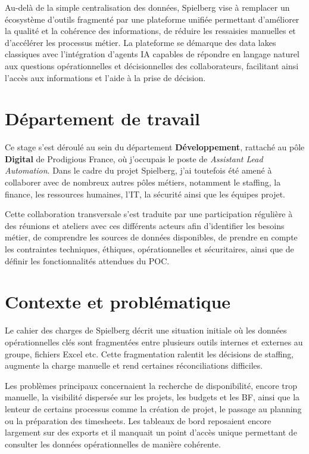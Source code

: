 \documentclass[a4paper,11pt,english,openany]{book}
\begin{document}
Au-delà de la simple centralisation des données, Spielberg vise à remplacer un écosystème d'outils fragmenté par une plateforme unifiée permettant d'améliorer la qualité et la cohérence des informations, de réduire les ressaisies manuelles et d'accélérer les processus métier. La plateforme se démarque des data lakes classiques avec l'intégration d'agents IA capables de répondre en langage naturel aux questions opérationnelles et décisionnelles des collaborateurs, facilitant ainsi l'accès aux informations et l'aide à la prise de décision.

\section{Département de travail}

Ce stage s'est déroulé au sein du département \textbf{Développement}, rattaché au pôle \textbf{Digital} de Prodigious France, où j'occupais le poste de \textit{Assistant Lead Automation}. Dans le cadre du projet Spielberg, j'ai toutefois été amené à collaborer avec de nombreux autres pôles métiers, notamment le staffing, la finance, les ressources humaines, l'IT, la sécurité ainsi que les équipes projet.

Cette collaboration transversale s'est traduite par une participation régulière à des réunions et ateliers avec ces différents acteurs afin d'identifier les besoins métier, de comprendre les sources de données disponibles, de prendre en compte les contraintes techniques, éthiques, opérationnelles et sécuritaires, ainsi que de définir les fonctionnalités attendues du POC.

\section{Contexte et problématique}

Le cahier des charges de Spielberg décrit une situation initiale où les données opérationnelles clés sont fragmentées entre plusieurs outils internes et externes au groupe, fichiers Excel etc. Cette fragmentation ralentit les décisions de staffing, augmente la charge manuelle et rend certaines réconciliations difficiles.

Les problèmes principaux concernaient la recherche de disponibilité, encore trop manuelle, la visibilité dispersée sur les projets, les budgets et les BF, ainsi que la lenteur de certains processus comme la création de projet, le passage au planning ou la préparation des timesheets. Les tableaux de bord reposaient encore largement sur des exports et il manquait un point d'accès unique permettant de consulter les données opérationnelles de manière cohérente.
\end{document}
